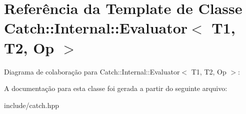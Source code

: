 \hypertarget{classCatch_1_1Internal_1_1Evaluator}{}\section{Referência da Template de Classe Catch\+:\+:Internal\+:\+:Evaluator$<$ T1, T2, Op $>$}
\label{classCatch_1_1Internal_1_1Evaluator}


Diagrama de colaboração para Catch\+:\+:Internal\+:\+:Evaluator$<$ T1, T2, Op $>$\+:


A documentação para esta classe foi gerada a partir do seguinte arquivo\+:\begin{DoxyCompactItemize}
\item 
include/catch.\+hpp\end{DoxyCompactItemize}
